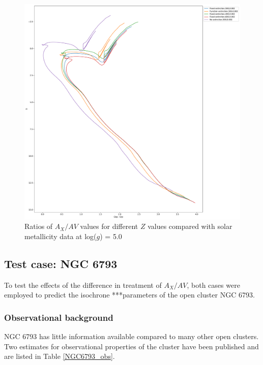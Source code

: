 \documentclass[a4paper, 11pt, oneside]{LJMU_Astro_Thesis}  %
\begin{document}
\begin{figure}[h]
\begin{center}
\includegraphics[scale=0.3]{../basti_isochrones_10_13Gyr/Extinction_T50k_FeH0fix_func_G_GbpmGrp_500_400_600_Myr_FeH_0p002_ref_noext_Av_1p0.pdf}
\caption{Ratios of $A_{X}/A{V}$ values for different $Z$ values compared with solar metallicity data at log($g$) = 5.0}
\label{gaia_isoc_T50k}
\end{center}
\end{figure}

\subsection{Test case: NGC 6793}
To test the effects of the difference in treatment of $A_{X}/A{V}$, both cases were employed to predict the isochrone ***parameters of the open cluster NGC 6793.

\subsubsection{Observational background}
NGC 6793 has little information available compared to many other open clusters. Two estimates for observational properties of the cluster have been published and are listed in Table \ref{NGC6793_obs}.
\end{document}
